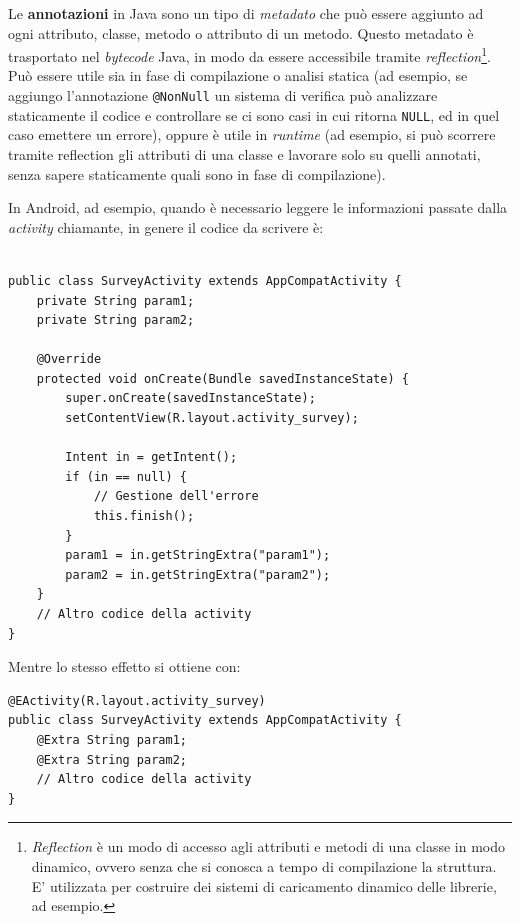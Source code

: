 \documentclass[a4paper,10pt]{memoir}
\begin{document}
Le \textbf{annotazioni} in Java sono un tipo di \textit{metadato} che può essere aggiunto ad ogni attributo, classe, metodo o attributo di un metodo. Questo metadato è trasportato nel \textit{bytecode} Java, in modo da essere accessibile tramite \textit{reflection}\footnote{\textit{Reflection} è un modo di accesso agli attributi e metodi di una classe in modo dinamico, ovvero senza che si conosca a tempo di compilazione la struttura. E' utilizzata per costruire dei sistemi di caricamento dinamico delle librerie, ad esempio.}. Può essere utile sia in fase di compilazione o analisi statica (ad esempio, se aggiungo l'annotazione \texttt{@NonNull} un sistema di verifica può analizzare staticamente il codice e controllare se ci sono casi in cui ritorna \texttt{NULL}, ed in quel caso emettere un errore), oppure è utile in \textit{runtime} (ad esempio, si può scorrere tramite reflection gli attributi di una classe e lavorare solo su quelli annotati, senza sapere staticamente quali sono in fase di compilazione).

\medskip

In Android, ad esempio, quando è necessario leggere le informazioni passate dalla \textit{activity} chiamante, in genere il codice da scrivere è:

\begin{listing}[H]
\begin{verbatim}
               
public class SurveyActivity extends AppCompatActivity {
	private String param1;
	private String param2;

	@Override
	protected void onCreate(Bundle savedInstanceState) {
		super.onCreate(savedInstanceState);
		setContentView(R.layout.activity_survey);
		
		Intent in = getIntent();
		if (in == null) {
			// Gestione dell'errore
			this.finish();
		}
		param1 = in.getStringExtra("param1");
		param2 = in.getStringExtra("param2");
	}
	// Altro codice della activity
}
\end{verbatim}
\end{listing}

Mentre lo stesso effetto si ottiene con:

\begin{listing}[H]
\begin{verbatim}
@EActivity(R.layout.activity_survey)
public class SurveyActivity extends AppCompatActivity {
	@Extra String param1;
	@Extra String param2;
	// Altro codice della activity
}
\end{verbatim}
\end{listing}
\end{document}
